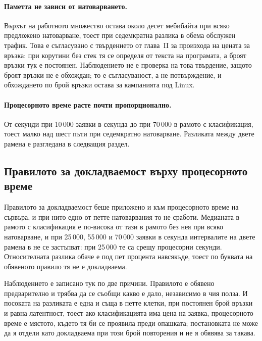 \paragraph{Паметта не зависи от натоварването.} Върхът на работното множество остава около
десет мебибайта при всяко предложено натоварване, тоест при седемкратна разлика в обема
обслужен трафик. Това е съгласувано с твърдението от глава~II за произхода на цената за
връзка: при корутини без стек тя се определя от текста на програмата, а броят връзки тук е
постоянен. Наблюдението не е проверка на това твърдение, защото броят връзки не е обхождан;
то е съгласуваност, а не потвърждение, и обхождането по брой връзки остава за кампанията под
Linux.

\paragraph{Процесорното време расте почти пропорционално.} От
 секунди при 10\,000 заявки в
секунда до  при 70\,000 в рамото с
класификация, тоест малко над шест пъти при седемкратно натоварване. Разликата между
двете рамена е разгледана в следващия раздел.

\subsection{Правилото за докладваемост върху процесорното време}
\label{sec:cpu-anomaly}

Правилото за докладваемост беше приложено и към процесорното време на сървъра, и при нито
едно от петте натоварвания то не сработи. Медианата в рамото с класификация е по-висока от
тази в рамото без нея при всяко натоварване, и при 25\,000, 55\,000 и 70\,000 заявки в
секунда интервалите на двете рамена в  не се застъпват: при 25\,000 те са
 срещу
 процесорни секунди. Относителната
разлика обаче е под пет процента навсякъде, тоест по буквата на обявеното правило тя не е
докладваема.

Наблюдението е записано тук по две причини. Правилото е обявено предварително и трябва да се
съобщи какво е дало, независимо в чия полза. И посоката на разликата е една и съща в петте
клетки, при постоянен брой връзки и равна латентност, тоест ако класификацията има цена на
заявка, процесорното време е мястото, където тя би се проявила преди опашката; постановката
не може да я отдели като докладваема при този брой повторения и не я обявява за такава.

